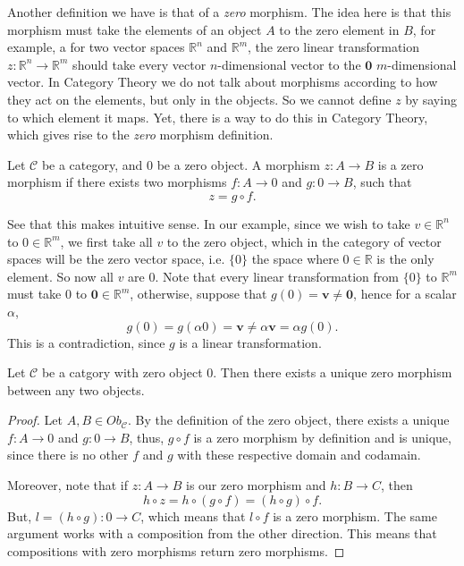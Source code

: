 Another definition we have is that of a \textit{zero} morphism. The idea here
is that this morphism must take the elements of an object $A$ to the
zero element in $B$, for example, a for two vector spaces $\mathbb R^n$ and $\mathbb R^m$,
the zero linear transformation $z:\mathbb R^n \to \mathbb R^m$ should take every vector
$n$-dimensional vector to the $\mathbf{0}$ $m$-dimensional vector. In Category
Theory we do not talk about morphisms according to how they act on the elements, but
only in the objects. So we cannot define $z$ by saying to which element it maps.
Yet, there is a way to do this in Category Theory, which gives rise to the \textit{zero} morphism
definition.
\begin{definition}
	Let $\mathcal C$ be a category, and $0$ be a zero object.
	A morphism $z:A \to B$ is a zero morphism if there exists two morphisms
	$f:A\to 0$ and $g:0 \to B$, such that
	\begin{displaymath}
		z = g \circ f.
	\end{displaymath}
\end{definition}
See that this makes intuitive sense. In our example, since we wish to take
$v \in \mathbb R^n$ to $0 \in \mathbb R^m$, we first take all $v$ to the zero object,
which in the category of vector spaces will be the zero vector space, i.e. $\{0\}$ the space
where $0 \in \mathbb R$ is the only element. So now all $v$ are $0$. Note that
every linear transformation from $\{0\}$ to $\mathbb R^m$ must take $0$ to $\mathbf{0} \in \mathbb R^m$,
otherwise, suppose that $g(0)=\mathbf{v} \neq \mathbf{0}$, hence for a scalar $\alpha$,
\begin{displaymath}
	g(0) = g(\alpha0) = \mathbf{v} \neq \alpha \mathbf{v} = \alpha g(0).
\end{displaymath}
This is a contradiction, since $g$ is a linear transformation.

\begin{theorem}
	Let $\mathcal C$ be a catgory with zero object $0$.
	Then there exists a unique zero morphism between any two objects.
\end{theorem}
\begin{proof}
	Let $A, B \in Ob_\mathcal C$.
	By the definition of the zero object, there exists a unique
	$f:A \to 0$ and $g:0\to B$, thus, $g \circ f$ is a zero morphism
	by definition and is unique, since there is no other $f$ and $g$ with these respective
	domain and codamain.

	Moreover, note that if $z:A \to B$ is our zero morphism and $h:B \to C$, then
	\begin{displaymath}
		h \circ z = h \circ (g \circ f) = (h \circ g) \circ f.
	\end{displaymath}
	But, $l =(h \circ g):0 \to C$, which means that $l \circ f$ is a zero morphism.
	The same argument works with a composition from the other direction. This means
	that compositions with zero morphisms return zero morphisms.
\end{proof}

